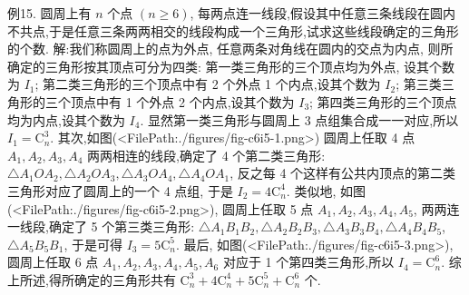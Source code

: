 例15. 圆周上有 $n$ 个点 $(n \geqslant 6)$, 每两点连一线段,假设其中任意三条线段在圆内不共点,于是任意三条两两相交的线段构成一个三角形,试求这些线段确定的三角形的个数.
解:我们称圆周上的点为外点, 任意两条对角线在圆内的交点为内点, 则所确定的三角形按其顶点可分为四类:
第一类三角形的三个顶点均为外点, 设其个数为 $I_1$;
第二类三角形的三个顶点中有 2 个外点 1 个内点,设其个数为 $I_2$;
第三类三角形的三个顶点中有 1 个外点 2 个内点,设其个数为 $I_3$;
第四类三角形的三个顶点均为内点,设其个数为 $I_4$.
显然第一类三角形与圆周上 3 点组集合成一一对应,所以 $I_1=\mathrm{C}_n^3$.
其次,如图(<FilePath:./figures/fig-c6i5-1.png>) 圆周上任取 4 点 $A_1, A_2, A_3, A_4$ 两两相连的线段,确定了 4 个第二类三角形: $\triangle A_1 O A_2, \triangle A_2 O A_3, \triangle A_3 O A_4, \triangle A_4 O A_1$, 反之每 4 个这样有公共内顶点的第二类三角形对应了圆周上的一个 4 点组, 于是 $I_2=4 \mathrm{C}_n^4$.
类似地, 如图(<FilePath:./figures/fig-c6i5-2.png>), 圆周上任取 5 点 $A_1, A_2, A_3, A_4, A_5$, 两两连一线段,确定了 5 个第三类三角形: $\triangle A_1 B_1 B_2, \triangle A_2 B_2 B_3, \triangle A_3 B_3 B_4, \triangle A_4 B_4 B_5$, $\triangle A_5 B_5 B_1$, 于是可得 $I_3=5 \mathrm{C}_n^5$.
最后, 如图(<FilePath:./figures/fig-c6i5-3.png>), 圆周上任取 6 点 $A_1, A_2, A_3, A_4, A_5, A_6$ 对应于 1 个第四类三角形,所以 $I_4=\mathrm{C}_n^6$.
综上所述,得所确定的三角形共有 $\mathrm{C}_n^3+4 \mathrm{C}_n^4+5 \mathrm{C}_n^5+\mathrm{C}_n^6$ 个.


